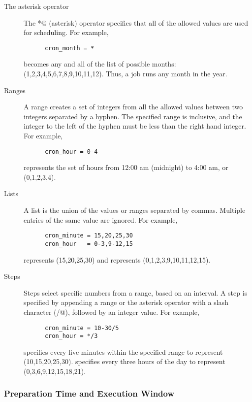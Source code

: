 \begin{description}
   \item[The asterisk operator]
   The \verb@*@ (asterisk) operator specifies that all of the 
   allowed values are used for scheduling.
   For example,
   \begin{verbatim}
      cron_month = *
   \end{verbatim}
   becomes any and all of the list of possible months:
   (1,2,3,4,5,6,7,8,9,10,11,12).
   Thus, a job runs any month in the year.

   \item[Ranges]
   A range creates a set of integers from all the allowed values between two
   integers separated by a hyphen. The specified range is inclusive, and the
   integer to the left of the hyphen must be less than the right hand integer.
   For example,
   \begin{verbatim}
      cron_hour = 0-4
   \end{verbatim}
   represents the set of
   hours from 12:00 am (midnight) to 4:00 am, or (0,1,2,3,4).
   
   \item[Lists]
   A list is the union of the values or ranges separated by commas. Multiple
   entries of the same value are ignored. 
   For example,
   \begin{verbatim}
      cron_minute = 15,20,25,30
      cron_hour   = 0-3,9-12,15
   \end{verbatim}
    represents (15,20,25,30)
   and  represents (0,1,2,3,9,10,11,12,15).
      
   \item[Steps]
   Steps select specific numbers from a range, based on an interval.
   A step is specified by appending a range or the asterisk
   operator with a slash character (\verb@/@),
   followed by an integer value.
   For example,
   \begin{verbatim}
      cron_minute = 10-30/5
      cron_hour = */3
   \end{verbatim}
    specifies
   every five minutes within the specified range 
   to represent (10,15,20,25,30).
    specifies every three hours of the day
   to represent (0,3,6,9,12,15,18,21).
   

\end{description}

\subsubsection{Preparation Time and Execution Window}
\label{sec:CronTab-PrepTime}

